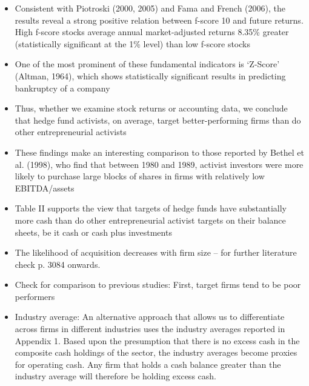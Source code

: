 \documentclass[12pt]{article}
\begin{document}
\begin{itemize}
        \item Consistent with Piotroski (2000, 2005) and Fama and French (2006), the results reveal a strong positive relation between f-score 10 and future returns. High f-score stocks average annual market-adjusted returns 8.35\% greater (statistically significant at the 1\% level) than low f-score stocks \citep{Choi2012} 

       \item One of the most prominent of these fundamental indicators is ‘Z-Score’ (Altman, 1964), which shows statistically significant results in predicting bankruptcy of a company \citep{Mohr2012}

       \item Thus, whether we examine stock returns or accounting data, we conclude that hedge fund activists, on average, target better-performing firms than do other entrepreneurial activists \citep{Klein2009}

       \item These findings make an interesting comparison to those reported by Bethel et al. (1998), who find that between 1980 and 1989, activist investors were more likely to purchase large blocks of shares in firms with relatively low EBITDA/assets \citep{Klein2009}

       \item Table II supports the view that targets of hedge funds have substantially more cash than do other entrepreneurial activist targets on their balance sheets, be it cash or cash plus investments \citep{Klein2009}

       \item The likelihood of acquisition decreases with firm size \citep{Akhigbe2007} -- for further literature check p. 3084 onwards.

       \item Check for comparison to previous studies: First, target firms tend to be poor performers \citep{Denes2017}

       \item Industry average: An alternative approach that allows us to differentiate across firms in different industries uses the industry averages reported in Appendix 1. Based upon the presumption that there is no excess cash in the composite cash holdings of the sector, the industry averages become proxies for operating cash. Any firm that holds a cash balance greater than the industry average will therefore be holding excess cash. \citep{Damodaran2005}
    \end{itemize}
\end{document}
